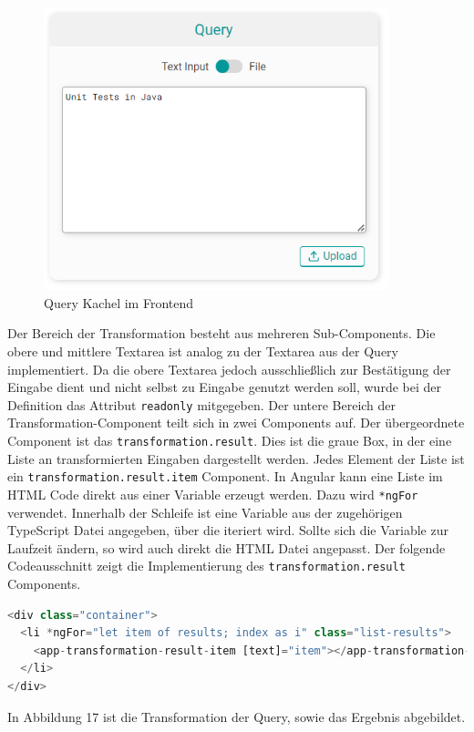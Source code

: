 \begin{figure}[H]
  \centering
    \includegraphics[width = 10cm]{bilder/websiteQuery}
    \caption{Query Kachel im Frontend}
\end{figure}

Der Bereich der Transformation besteht aus mehreren Sub-Components. Die obere und mittlere Textarea ist analog zu der Textarea aus der Query implementiert. Da die obere Textarea jedoch ausschließlich zur Bestätigung der Eingabe dient und nicht selbst zu Eingabe genutzt werden soll, wurde bei der Definition das Attribut \texttt{readonly} mitgegeben. Der untere Bereich der Transformation-Component teilt sich in zwei Components auf. Der übergeordnete Component ist das \texttt{transformation.result}. Dies ist die graue Box, in der eine Liste an transformierten Eingaben dargestellt werden. Jedes Element der Liste ist ein \texttt{transformation.result.item} Component. In Angular kann eine Liste im HTML Code direkt aus einer Variable erzeugt werden. Dazu wird \texttt{*ngFor} verwendet. Innerhalb der Schleife ist eine Variable aus der zugehörigen TypeScript Datei angegeben, über die iteriert wird. Sollte sich die Variable zur Laufzeit ändern, so wird auch direkt die HTML Datei angepasst. Der folgende Codeausschnitt zeigt die Implementierung des \texttt{transformation.result} Components.

\begin{lstlisting}[language=Python]
<div class="container">
  <li *ngFor="let item of results; index as i" class="list-results">
    <app-transformation-result-item [text]="item"></app-transformation-result-item>
  </li>
</div>
\end{lstlisting}

In Abbildung 17 ist die Transformation der Query, sowie das Ergebnis abgebildet.

